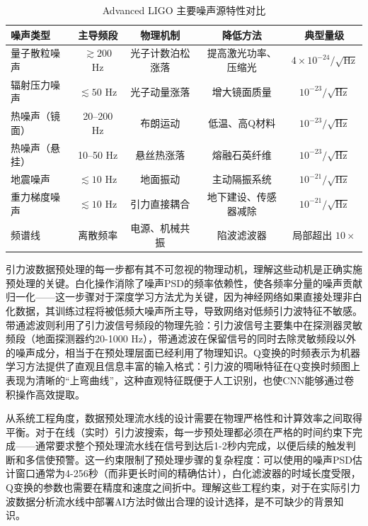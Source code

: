 \begin{table}[htbp]
\centering
\caption{Advanced LIGO 主要噪声源特性对比}
\label{tab:noise_sources}
\small
\begin{tabular}{lcccc}
\hline
\textbf{噪声类型} & \textbf{主导频段} & \textbf{物理机制} & \textbf{降低方法} & \textbf{典型量级} \\
\hline
量子散粒噪声 & $\gtrsim 200$ Hz & 光子计数泊松涨落 & 提高激光功率、压缩光 & $4\times10^{-24}/\sqrt{\text{Hz}}$ \\
辐射压力噪声 & $\lesssim 50$ Hz & 光子动量涨落 & 增大镜面质量 & $10^{-23}/\sqrt{\text{Hz}}$ \\
热噪声（镜面） & 20--200 Hz & 布朗运动 & 低温、高Q材料 & $10^{-23}/\sqrt{\text{Hz}}$ \\
热噪声（悬挂） & 10--50 Hz & 悬丝热涨落 & 熔融石英纤维 & $10^{-23}/\sqrt{\text{Hz}}$ \\
地震噪声 & $\lesssim 10$ Hz & 地面振动 & 主动隔振系统 & $10^{-21}/\sqrt{\text{Hz}}$ \\
重力梯度噪声 & $\lesssim 10$ Hz & 引力直接耦合 & 地下建设、传感器减除 & $10^{-21}/\sqrt{\text{Hz}}$ \\
频谱线 & 离散频率 & 电源、机械共振 & 陷波滤波器 & 局部超出 $10\times$ \\
\hline
\end{tabular}
\end{table}

引力波数据预处理的每一步都有其不可忽视的物理动机，理解这些动机是正确实施预处理的关键。白化操作消除了噪声PSD的频率依赖性，使各频率分量的噪声贡献归一化——这一步骤对于深度学习方法尤为关键，因为神经网络如果直接处理非白化数据，其训练过程将被低频大噪声所主导，导致网络对低频引力波特征不敏感。带通滤波则利用了引力波信号频段的物理先验：引力波信号主要集中在探测器灵敏频段（地面探测器约20-1000 Hz），带通滤波在保留信号的同时去除灵敏频段以外的噪声成分，相当于在预处理层面已经利用了物理知识。Q变换的时频表示为机器学习方法提供了直观且信息丰富的输入格式：引力波的啁啾特征在Q变换时频图上表现为清晰的“上弯曲线”，这种直观特征既便于人工识别，也使CNN能够通过卷积操作高效提取。

从系统工程角度，数据预处理流水线的设计需要在物理严格性和计算效率之间取得平衡。对于在线（实时）引力波搜索，每一步预处理都必须在严格的时间约束下完成——通常要求整个预处理流水线在信号到达后1-2秒内完成，以便后续的触发判断和多信使预警。这一约束限制了预处理步骤的复杂程度：可以使用的噪声PSD估计窗口通常为4-256秒（而非更长时间的精确估计），白化滤波器的时域长度受限，Q变换的参数也需要在精度和速度之间折中。理解这些工程约束，对于在实际引力波数据分析流水线中部署AI方法时做出合理的设计选择，是不可缺少的背景知识。

